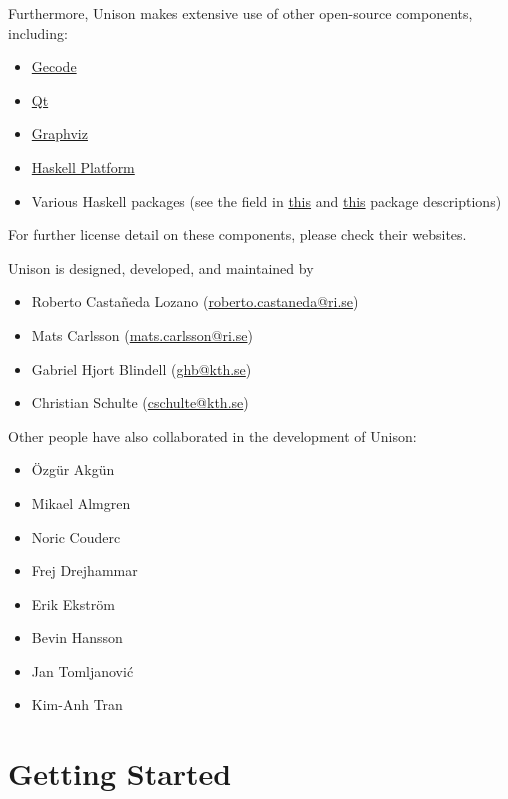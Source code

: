 \documentclass[11pt]{report}
\begin{document}
Furthermore, Unison makes extensive use of other open-source components,
including:

\begin{itemize}
\item \href{http://www.gecode.org/}{Gecode}
\item \href{https://www.qt.io/}{Qt}
\item \href{http://www.graphviz.org/}{Graphviz}
\item \href{https://www.haskell.org/platform/}{Haskell Platform}
\item Various Haskell packages (see the  field in
  \href{https://github.com/unison-code/unison/blob/master/src/unison/unison.cabal}{this}
  and
  \href{https://github.com/unison-code/unison/blob/master/src/unison-specsgen/unison-specsgen.cabal}{this}
  package descriptions)
\end{itemize}

For further license detail on these components, please check their websites.

Unison is designed, developed, and maintained by

\begin{itemize}
\item Roberto Castañeda Lozano (\href{mailto:roberto.castaneda@ri.se}{roberto.castaneda@ri.se})
\item Mats Carlsson (\href{mailto:mats.carlsson@ri.se}{mats.carlsson@ri.se})
\item Gabriel Hjort Blindell (\href{mailto:ghb@kth.se}{ghb@kth.se})
\item Christian Schulte (\href{mailto:cschulte@kth.se}{cschulte@kth.se})
\end{itemize}

Other people have also collaborated in the development of Unison:
%
\begin{itemize}
\item Özgür Akgün
\item Mikael Almgren
\item Noric Couderc
\item Frej Drejhammar
\item Erik Ekström
\item Bevin Hansson
\item Jan Tomljanović
\item Kim-Anh Tran
\end{itemize}

\chapter{Getting Started}%
\label{sec:getting-started}
\end{document}
